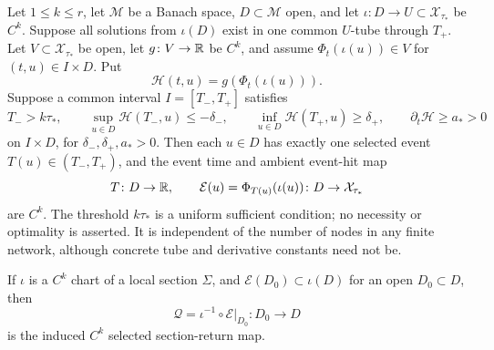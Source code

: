 \begin{theorem}
\label{thm:eventual-selected-return}
Let \(1\le k\le r\), let \(\mathcal M\) be a Banach space,
\(D\subset\mathcal M\) open, and let
\(\iota\colon D\to U\subset\mathcal X_{\tau_*}\) be \(C^k\).  Suppose all
solutions from \(\iota(D)\) exist in one common \(U\)-tube through \(T_+\).
Let \(V\subset\mathcal X_{\tau_*}\) be open, let
\(g\colon V\to\mathbb R\) be \(C^k\), and assume
\(\Phi_t(\iota(u))\in V\) for \((t,u)\in I\times D\).  Put
\[
 \mathcal H(t,u)=g(\Phi_t(\iota(u))).
\]
Suppose a common interval \(I=[T_-,T_+]\) satisfies
\begin{equation}
 T_->k\tau_*,\qquad
 \sup_{u\in D}\mathcal H(T_-,u)\le-\delta_-,\qquad
 \inf_{u\in D}\mathcal H(T_+,u)\ge\delta_+,
 \qquad
 \partial_t\mathcal H\ge a_*>0                     \label{eq:eventual-return-gates}
\end{equation}
on \(I\times D\), for \(\delta_-,\delta_+,a_*>0\).  Then each
\(u\in D\) has exactly one selected event
\(T(u)\in(T_-,T_+)\), and the event time and ambient event-hit map
\[
 T\colon D\to\mathbb R,
 \qquad \mathcal E(u)=\Phi_{T(u)}(\iota(u))
       \colon D\to\mathcal X_{\tau_*}
\]
are \(C^k\).  The threshold \(k\tau_*\) is a uniform sufficient condition;
no necessity or optimality is asserted.  It is independent of the number of
nodes in any finite network, although concrete tube and derivative constants
need not be.

If \(\iota\) is a \(C^k\) chart of a local section \(\Sigma\), and
\(\mathcal E(D_0)\subset\iota(D)\) for an open \(D_0\subset D\), then
\begin{equation}
 \mathcal Q=\iota^{-1}\circ\mathcal E\big|_{D_0}
 \colon D_0\to D                                      \label{eq:induced-selected-return}
\end{equation}
is the induced \(C^k\) selected section-return map.
\end{theorem}

